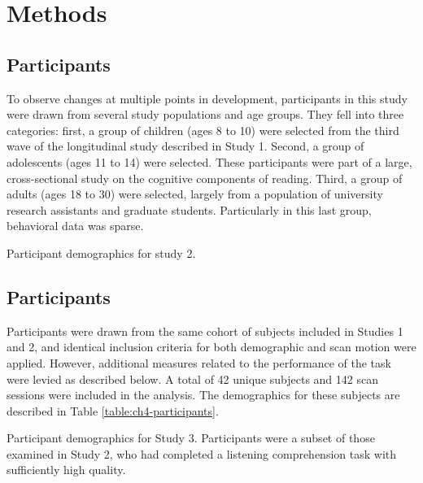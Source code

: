 \section{Methods}

\subsection{Participants}

To observe changes at multiple points in development, participants in this study were drawn from several study populations and age groups. They fell into three categories: first, a group of children (ages 8 to 10) were selected from the third wave of the longitudinal study described in Study 1. Second, a group of adolescents (ages 11 to 14) were selected. These participants were part of a large, cross-sectional study on the cognitive components of reading. Third, a group of adults (ages 18 to 30) were selected, largely from a population of university research assistants and graduate students. Particularly in this last group, behavioral data was sparse. 

\begin{table}[t]
	\renewcommand{\tabcolsep}{0.09cm}
	\centering
	
	\caption{Participant demographics for study 2.}
	\label{table:ch5-participants}
\end{table}

\subsection{Participants}

Participants were drawn from the same cohort of subjects included in Studies 1 and 2, and identical inclusion criteria for both demographic and scan motion were applied. However, additional measures related to the performance of the task were levied as described below. A total of 42 unique subjects and 142 scan sessions were included in the analysis. The demographics for these subjects are described in Table \ref{table:ch4-participants}.

\begin{table}[t]
	\renewcommand{\tabcolsep}{0.09cm}
	\centering
	
	\caption[Participant demographics for Study 3.]{Participant demographics for Study 3. Participants were a subset of those examined in Study 2, who had completed a listening comprehension task with sufficiently high quality.}
	\label{table:ch4-participants}
\end{table}

